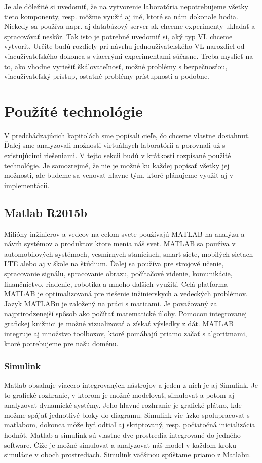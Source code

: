 Je ale dôležité si uvedomiť, že na vytvorenie laboratória nepotrebujeme všetky tieto komponenty, resp. môžme využiť aj iné, ktoré sa nám dokonale hodia. Niekedy sa používa napr. aj databázový server ak chceme experimenty ukladať a spracovávať neskôr. Tak isto je potrebné uvedomiť si, aký typ VL chceme vytvoriť. Určite budú rozdiely pri návrhu jednoužívateľského VL narozdiel od viacužívateľského dokonca s viacerými experimentami súčasne. Treba myslieť na to, ako vhodne vyriešiť škálovateľnosť, možné problémy s bezpečnosťou, viacužívateľský prístup, ostatné problémy prístupnosti a podobne.


\section{Použíté technológie}\label{used-technologies}
V predchádzajúcich kapitolách sme popísali cieľe, čo chceme vlastne dosiahnuť. Ďalej sme analyzovali možnosti virtuálnych laboratórií a porovnali už s existujúcimi riešeniami. V tejto sekcii budú v krátkosti rozpísané použité technológie. Je samozrejmé, že nie je možné ku každej popísať všetky jej možnosti, ale budeme sa venovať hlavne tým, ktoré plánujeme využiť aj v implementácií.

\subsection{Matlab R2015b}
Milióny inžinierov a vedcov na celom svete používajú MATLAB na analýzu a návrh systémov a produktov ktore menia náš svet. MATLAB sa používa v automobilových systémoch, vesmírnych staniciach, smart siete, mobilých sieťach LTE alebo aj v škole na štúdium. Ďalej sa používa pre strojové učenie, spracovanie signálu, spracovanie obrazu, počítačové videnie, komunikácie, finančníctvo, riadenie, robotika a mnoho ďalšich využití.
Celá platforma MATLAB je optimalizovaná pre riešenie inžinierskych a vedeckých problémov. Jazyk MATLABu je založený na práci s maticami. Je považovaný za najprirodzenejší spôsob ako počítať matematické úlohy. Pomocou integrovanej grafickej knižnici je možné vizualizovať a získať výsledky z dát. MATLAB integruje aj množstvo toolboxov, ktoré pomáhajú priamo začať s algoritmami, ktoré potrebujeme pre našu doménu.\cite{matlab-mathworks}

\subsubsection{Simulink}
Matlab obsahuje viacero integrovaných nástrojov a jeden z nich je aj Simulink. Je to grafické rozhranie, v ktorom je možné modelovať, simulovať a potom aj analyzovať dynamické systémy. Jeho hlavné rozhranie je grafické plátno, kde možme spájať jednotlivé bloky do diagramu. Simulink vie úzko spolupracovať s matlabom, dokonca môže byť odtiaľ aj skriptovaný, resp. počiatočná inicializácia hodnôt. Matlab a simulink sú vlastne dve prostredia integrované do jedného software. Čiže je možné simulovať a analyzovať náš model v každom kroku simulácie v oboch prostrediach. Simulink väčšinou spúštame priamo z Matlabu.

